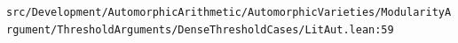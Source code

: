 \nolinkurl{src/Development/AutomorphicArithmetic/AutomorphicVarieties/ModularityArgument/ThresholdArguments/DenseThresholdCases/LitAut.lean:59}%
